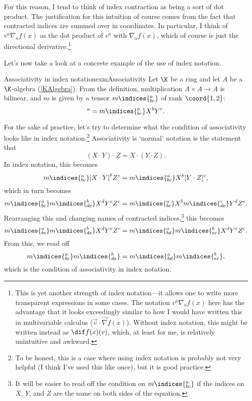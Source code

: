For this reason, I tend to think of index contraction as being a sort of dot product.  The justification for this intuition of course comes from the fact that contracted indices are summed over in coordinates.  In particular, I think of $v^a\nabla _af(x)$ as the dot product of $v^a$ with $\nabla _af(x)$, which of course is just the directional derivative.\footnote{This is yet another strength of index notation---it allows one to write more transparent expressions in some cases.  The notation $v^a\nabla _af(x)$ here has the advantage that it looks exceedingly similar to how I would have written this in multivariable calculus ($\vec{v}\cdot \vec{\nabla}f(x)$).  Without index notation, this might be written instead as $\dif f(x)(v)$, which, at least for me, is relatively unintuitive and awkward.}

Let's now take a look at a concrete example of the use of index notation.
\begin{exm}{Associativity in index notation}{exmAssociativity}
	Let $\K$ be a ring and let $A$ be a $\K$-algebra (\cref{KAlgebra}).  From the definition, multiplication $A\times A\rightarrow A$ is bilinear, and so is given by a tensor $m\indices{^a_{bc}}$ of rank $\coord{1,2}$:
	\begin{equation}
		[X\cdot Y]^a=m\indices{^a_{bc}}X^bY^c.
	\end{equation}
	
	For the sake of practice, let's try to determine what the condition of associativity looks like in index notation.\footnote{To be honest, this is a case where using index notation is probably not very helpful (I think I've used this like once), but it is good practice.}  Associativity is `normal' notation is the statement that
	\begin{equation}
		(X\cdot Y)\cdot Z=X\cdot (Y\cdot Z).
	\end{equation}
	In index notation, this becomes
	\begin{equation}
		m\indices{^a_{bc}}[X\cdot Y]^bZ^c=m\indices{^a_{bc}}X^b[Y\cdot Z]^c,
	\end{equation}
	which in turn becomes
	\begin{equation}
		m\indices{^a_{bc}}m\indices{^b_{de}}X^dY^eZ^c=m\indices{^a_{bc}}X^bm\indices{^c_{de}}Y^dZ^e.
	\end{equation}
	Rearranging this and changing names of contracted indices,\footnote{It will be easier to read off the condition on $m\indices{^a_{bc}}$ if the indices on $X$, $Y$, and $Z$ are the same on both sides of the equation.} this becomes
	\begin{equation}
		m\indices{^a_{bc}}m\indices{^b_{de}}X^dY^eZ^c=m\indices{^a_{bd}}m\indices{^b_{ec}}X^dY^eZ^c.
	\end{equation}
	From this, we read off
	\begin{equation}
		m\indices{^a_{bc}}m\indices{^b_{de}}=m\indices{^a_{bd}}m\indices{^b_{ec}},
	\end{equation}
	which is the condition of associativity in index notation.
\end{exm}

